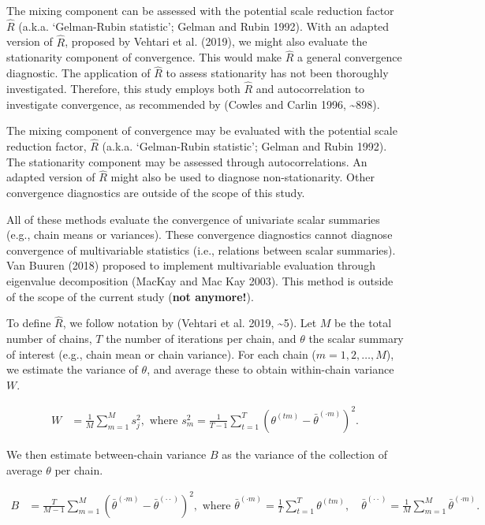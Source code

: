 \documentclass[
  Royal, times, sageapa]{sagej}
\begin{document}
The mixing component can be assessed with the potential scale reduction
factor \(\widehat{R}\) (a.k.a. `Gelman-Rubin statistic'; Gelman and
Rubin 1992). With an adapted version of \(\widehat{R}\), proposed by
Vehtari et al. (2019), we might also evaluate the stationarity component
of convergence. This would make \(\widehat{R}\) a general convergence
diagnostic. The application of \(\widehat{R}\) to assess stationarity
has not been thoroughly investigated. Therefore, this study employs both
\(\widehat{R}\) and autocorrelation to investigate convergence, as
recommended by (Cowles and Carlin 1996, \textasciitilde898).

The mixing component of convergence may be evaluated with the potential
scale reduction factor, \(\widehat{R}\) (a.k.a. `Gelman-Rubin
statistic'; Gelman and Rubin 1992). The stationarity component may be
assessed through autocorrelations. An adapted version of \(\widehat{R}\)
might also be used to diagnose non-stationarity. Other convergence
diagnostics are outside of the scope of this study.

All of these methods evaluate the convergence of univariate scalar
summaries (e.g., chain means or variances). These convergence
diagnostics cannot diagnose convergence of multivariable statistics
(i.e., relations between scalar summaries). Van Buuren (2018) proposed
to implement multivariable evaluation through eigenvalue decomposition
(MacKay and Mac Kay 2003). This method is outside of the scope of the
current study (\textbf{not anymore!}).

To define \(\widehat{R}\), we follow notation by (Vehtari et al. 2019,
\textasciitilde5). Let \(M\) be the total number of chains, \(T\) the
number of iterations per chain, and \(\theta\) the scalar summary of
interest (e.g., chain mean or chain variance). For each chain
(\(m = 1, 2, \dots, M\)), we estimate the variance of \(\theta\), and
average these to obtain within-chain variance \(W\).

\begin{align*}
W&=\frac{1}{M} \sum_{m=1}^{M} s_{j}^{2},  \text { where } s_{m}^{2}=\frac{1}{T-1} \sum_{t=1}^{T}\left(\theta^{(t m)}-\bar{\theta}^{(\cdot m)}\right)^{2}. 
\end{align*}

We then estimate between-chain variance \(B\) as the variance of the
collection of average \(\theta\) per chain.

\begin{align*}
B&=\frac{T}{M-1} \sum_{m=1}^{M}\left(\bar{\theta}^{(\cdot m)}-\bar{\theta}^{(\cdot \cdot)}\right)^{2}, \text { where } \bar{\theta}^{(\cdot m)}=\frac{1}{T} \sum_{t=1}^{T} \theta^{(t m)}, \quad \bar{\theta}^{(\cdot \cdot)}=\frac{1}{M} \sum_{m=1}^{M} \bar{\theta}^{(\cdot m)}. 
\end{align*}
\end{document}
